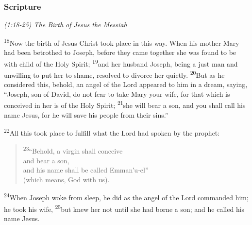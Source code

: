 \documentclass[letterpaper]{report}
\newcommand{\vs}[1]{\textsuperscript{#1}}
\begin{document}
\subsubsection{Scripture}

{\centering
\emph{(1:18-25) The Birth of Jesus the Messiah}\\
}
\begin{multicols}{2}
\vs{18}Now the birth of Jesus Christ took place in this way.
When his mother Mary had been betrothed to Joseph,
before they came together she was found to be with child of the Holy Spirit;
\vs{19}and her husband Joseph,
being a just man and unwilling to put her to shame,
resolved to divorce her quietly.
\vs{20}But as he considered this,
behold, an angel of the Lord appeared to him in a dream, saying,
``Joseph, son of David, do not fear to take Mary your wife,
for that which is conceived in her is of the Holy Spirit;
\vs{21}she will bear a son, and you shall call his name Jesus,
for he will save his people from their sins.''

\vs{22}All this took place to fulfill what the Lord had spoken by the prophet:

\begin{verse}
\vs{23}``Behold, a virgin shall conceive\\
and bear a son,\\
and his name shall be called Emman′u-el''\\
(which means, God with us).\\
\end{verse}

\vs{24}When Joseph woke from sleep,
he did as the angel of the Lord commanded him;
he took his wife,
\vs{25}but knew her not until she had borne a son;
and he called his name Jesus.
\end{multicols}
\end{document}
